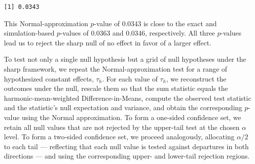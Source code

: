\documentclass[twoside,11pt]{article}
\begin{document}
\begin{verbatim}
[1] 0.0343
\end{verbatim}



This Normal-approximation \(p\)-value of 0.0343 is close to the exact
and simulation-based \(p\)-values of 0.0363 and 0.0346, respectively.
All three \(p\)-values lead us to reject the
sharp null of no effect in favor of a larger effect.

To test not only a single null hypothesis but a grid of null hypotheses
under the sharp framework, we repeat the Normal-approximation test for a
range of hypothesized constant effects, \(\tau_h\). For each value of
\(\tau_h\), we reconstruct the outcomes under the null, rescale them so
that the sum statistic equals the harmonic-mean-weighted
Difference-in-Means, compute the observed test statistic and the
statistic's null expectation and variance, and obtain the corresponding
\(p\)-value using the Normal approximation. To form a one-sided
confidence set, we retain all null values that are not rejected by the
upper-tail test at the chosen \(\alpha\) level. To form a two-sided
confidence set, we proceed analogously, allocating \(\alpha/2\) to each
tail --- reflecting that each null value is tested against departures in
both directions --- and using the corresponding upper- and lower-tail
rejection regions.
\end{document}
